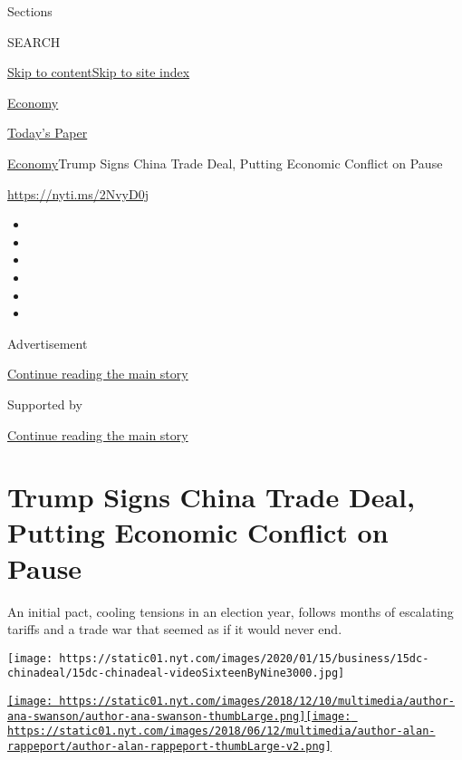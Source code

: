 Sections

SEARCH

\protect\hyperlink{site-content}{Skip to
content}\protect\hyperlink{site-index}{Skip to site index}

\href{https://www.nytimes.com/section/business/economy}{Economy}

\href{https://myaccount.nytimes.com/auth/login?response_type=cookie\&client_id=vi}{}

\href{https://www.nytimes.com/section/todayspaper}{Today's Paper}

\href{/section/business/economy}{Economy}\textbar{}Trump Signs China
Trade Deal, Putting Economic Conflict on Pause

\url{https://nyti.ms/2NvyD0j}

\begin{itemize}
\item
\item
\item
\item
\item
\item
\end{itemize}

Advertisement

\protect\hyperlink{after-top}{Continue reading the main story}

Supported by

\protect\hyperlink{after-sponsor}{Continue reading the main story}

\hypertarget{trump-signs-china-trade-deal-putting-economic-conflict-on-pause}{%
\section{Trump Signs China Trade Deal, Putting Economic Conflict on
Pause}\label{trump-signs-china-trade-deal-putting-economic-conflict-on-pause}}

An initial pact, cooling tensions in an election year, follows months of
escalating tariffs and a trade war that seemed as if it would never end.

\texttt{[image: https://static01.nyt.com/images/2020/01/15/business/15dc-chinadeal/15dc-chinadeal-videoSixteenByNine3000.jpg]}

\href{https://www.nytimes.com/by/ana-swanson}{\texttt{[image: https://static01.nyt.com/images/2018/12/10/multimedia/author-ana-swanson/author-ana-swanson-thumbLarge.png]}}\href{https://www.nytimes.com/by/alan-rappeport}{\texttt{[image: https://static01.nyt.com/images/2018/06/12/multimedia/author-alan-rappeport/author-alan-rappeport-thumbLarge-v2.png]}}

